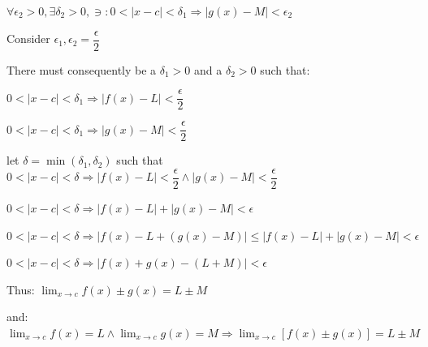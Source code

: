 \documentclass{article}
\begin{document}
$\forall \epsilon_2 > 0, \exists \delta_2 > 0, \ni : 0 < |x - c| <\delta_1 \Longrightarrow |g(x) - M| < \epsilon_2$

Consider $\epsilon_1, \epsilon_2 = \dfrac{\epsilon}{2}$

There must consequently be a $\delta_1 > 0$ and a $\delta_2 > 0$ such that:

$0 < |x - c| < \delta_1 \Longrightarrow |f(x) - L| < \dfrac{\epsilon}{2}$

$0 < |x - c| < \delta_1 \Longrightarrow |g(x) - M| < \dfrac{\epsilon}{2}$

let $\delta = \min(\delta_1, \delta_2) $ such that $ 0 <|x - c| < \delta \Longrightarrow |f(x) - L| < \dfrac{\epsilon}{2} \land |g(x) - M| < \dfrac{\epsilon}{2}$

$0 <|x - c| < \delta \Longrightarrow |f(x) - L| + |g(x) - M| < \epsilon$

$0 <|x - c| < \delta \Longrightarrow |f(x) - L + (g(x) - M)| \leq |f(x) - L| + |g(x) - M| < \epsilon$

$0 <|x - c| < \delta \Longrightarrow |f(x) + g(x) - (L + M)| < \epsilon$

\vspace{0.3cm}

Thus: $\displaystyle \lim_{x\to c} f(x) \pm g(x) = L \pm M$

and: $\displaystyle \lim_{x \to c} f(x) = L \land \lim_{x \to c} g(x) = M \Longrightarrow \lim_{x \to c} [f(x) \pm g(x)] = L \pm M$ 
\end{document}
